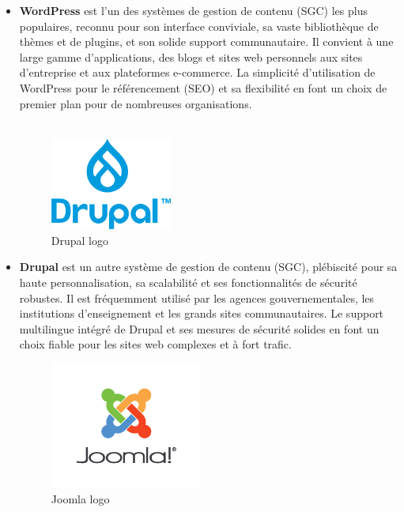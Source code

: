 \begin{itemize}

    \item \textbf{WordPress} est l'un des systèmes de gestion de contenu (SGC) les plus populaires, reconnu pour son interface conviviale, sa vaste bibliothèque de thèmes et de plugins, et son solide support communautaire. Il convient à une large gamme d'applications, des blogs et sites web personnels aux sites d'entreprise et aux plateformes e-commerce.  La simplicité d'utilisation de WordPress pour le référencement (SEO) et sa flexibilité en font un choix de premier plan pour de nombreuses organisations.
          \\
          \\
          \begin{figure}[H]
              \centering
              \includegraphics[width=4cm]{Figures/Drupal.png}
              \caption{Drupal logo}
          \end{figure}


    \item \textbf{Drupal} est un autre système de gestion de contenu (SGC), plébiscité pour sa haute personnalisation, sa scalabilité et ses fonctionnalités de sécurité robustes. Il est fréquemment utilisé par les agences gouvernementales, les institutions d'enseignement et les grands sites communautaires. Le support multilingue intégré de Drupal et ses mesures de sécurité solides en font un choix fiable pour les sites web complexes et à fort trafic.

          \begin{figure}[H]
              \centering
              \includegraphics[width=5cm]{Figures/Joomla.png}
              \caption{Joomla logo}
          \end{figure}



\end{itemize}
